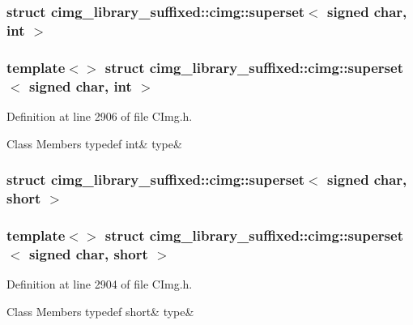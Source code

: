 \subsubsection{struct cimg\+\_\+library\+\_\+suffixed\+:\+:cimg\+:\+:superset$<$ signed char, int $>$}
\subsubsection*{template$<$$>$\newline
struct cimg\+\_\+library\+\_\+suffixed\+::cimg\+::superset$<$ signed char, int $>$}



Definition at line 2906 of file C\+Img.\+h.

\begin{DoxyFields}{Class Members}
\mbox{\label{namespacecimg__library__suffixed_1_1cimg_a617e3b198272fb8924e7de6bbc57b5f1}} 
typedef int&
type&
\\
\hline

\end{DoxyFields}
\label{structcimg__library__suffixed_1_1cimg_1_1superset_3_01signed_01char_00_01short_01_4}
\subsubsection{struct cimg\+\_\+library\+\_\+suffixed\+:\+:cimg\+:\+:superset$<$ signed char, short $>$}
\subsubsection*{template$<$$>$\newline
struct cimg\+\_\+library\+\_\+suffixed\+::cimg\+::superset$<$ signed char, short $>$}



Definition at line 2904 of file C\+Img.\+h.

\begin{DoxyFields}{Class Members}
\mbox{\label{namespacecimg__library__suffixed_1_1cimg_a2c26ad7eb46576ab84db770dca876d4a}} 
typedef short&
type&
\\
\hline

\end{DoxyFields}
\label{structcimg__library__suffixed_1_1cimg_1_1superset_3_01signed_01char_00_01unsigned_01char_01_4}
